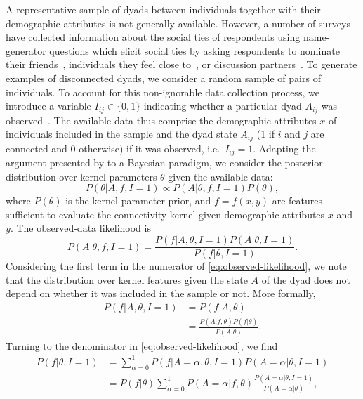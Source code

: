 \documentclass{scrartcl}
\begin{document}
\begin{refsection}
A representative sample of dyads between individuals together with their demographic attributes is not generally available. However, a number of surveys have collected information about the social ties of respondents using name-generator questions which elicit social ties by asking respondents to nominate their friends~\cite{Kalmijn2007}, individuals they feel close to~\cite{Hipp2009}, or discussion partners~\cite{Marsden1987,McPherson2006}. To generate examples of disconnected dyads, we consider a random sample of pairs of individuals. To account for this non-ignorable data collection process, we introduce a variable $I_{ij}\in\{0,1\}$ indicating whether a particular dyad $A_{ij}$ was observed~\cite[chapter 8]{Gelman2013}. The available data thus comprise the demographic attributes $x$ of individuals included in the sample and the dyad state $A_{ij}$ (1 if $i$ and $j$ are connected and $0$ otherwise) if it was observed, i.e.\ $I_{ij}=1$. Adapting the argument presented by \textcite{King2001} to a Bayesian paradigm, we consider the posterior distribution over kernel parameters $\theta$ given the available data:
\begin{equation}
    P(\theta|A, f, I=1)\propto P(A|\theta,f,I=1)P(\theta),\label{eq:parameter-posterior}
\end{equation}
where $P(\theta)$ is the kernel parameter prior, and $f=f(x,y)$ are features sufficient to evaluate the connectivity kernel given demographic attributes $x$ and $y$. The observed-data likelihood is
\begin{equation}
    P(A|\theta,f,I=1)=\frac{P(f|A,\theta,I=1)P(A|\theta,I=1)}{P(f|\theta,I=1)}.\label{eq:observed-likelihood}
\end{equation}
Considering the first term in the numerator of \cref{eq:observed-likelihood}, we note that the distribution over kernel features given the state $A$ of the dyad does not depend on whether it was included in the sample or not. More formally,
\begin{align}
    P(f|A,\theta,I=1)&=P(f|A,\theta)\nonumber\\
    &=\frac{P(A|f,\theta)P(f|\theta)}{P(A|\theta)}.\label{eq:conditional-equivalence}
\end{align}
Turning to the denominator in \cref{eq:observed-likelihood}, we find
\begin{align}
    P(f|\theta,I=1)&=\sum_{\alpha=0}^1 P(f|A=\alpha,\theta,I=1)P(A=\alpha|\theta,I=1)\nonumber\\
    &=P(f|\theta)\sum_{\alpha=0}^1 P(A=\alpha|f,\theta)\frac{P(A=\alpha|\theta,I=1)}{P(A=\alpha|\theta)},\label{eq:likelihood-denominator}

\end{align}
\end{refsection}
\end{document}
